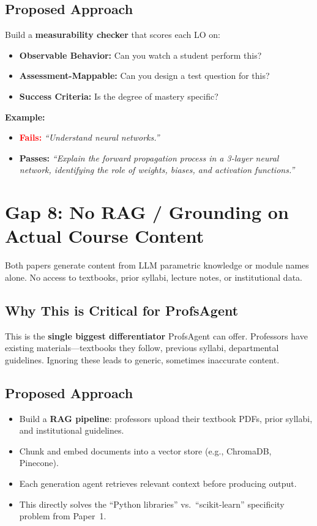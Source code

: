 \documentclass[11pt,a4paper]{article}
\begin{document}
\subsection{Proposed Approach}
Build a \textbf{measurability checker} that scores each LO on:
\begin{itemize}[nosep]
    \item \textbf{Observable Behavior:} Can you watch a student perform this?
    \item \textbf{Assessment-Mappable:} Can you design a test question for this?
    \item \textbf{Success Criteria:} Is the degree of mastery specific?
\end{itemize}

\textbf{Example:}
\begin{itemize}[nosep]
    \item \textcolor{red}{\textbf{Fails:}} \textit{``Understand neural networks.''}
    \item \textcolor{greenBorder}{\textbf{Passes:}} \textit{``Explain the forward propagation process in a 3-layer neural network, identifying the role of weights, biases, and activation functions.''}
\end{itemize}

\section{Gap 8: No RAG / Grounding on Actual Course Content}

Both papers generate content from LLM parametric knowledge or module names alone. No access to textbooks, prior syllabi, lecture notes, or institutional data.

\subsection{Why This is Critical for ProfsAgent}
This is the \textbf{single biggest differentiator} ProfsAgent can offer. Professors have existing materials---textbooks they follow, previous syllabi, departmental guidelines. Ignoring these leads to generic, sometimes inaccurate content.

\subsection{Proposed Approach}
\begin{itemize}[nosep]
    \item Build a \textbf{RAG pipeline}: professors upload their textbook PDFs, prior syllabi, and institutional guidelines.
    \item Chunk and embed documents into a vector store (e.g., ChromaDB, Pinecone).
    \item Each generation agent retrieves relevant context before producing output.
    \item This directly solves the ``Python libraries'' vs.\ ``scikit-learn'' specificity problem from Paper~1.
\end{itemize}
\end{document}
